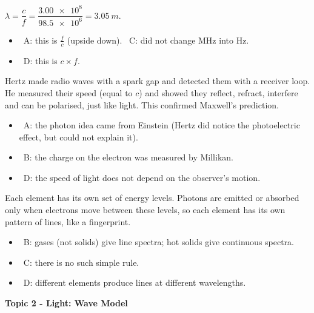 \documentclass[12pt]{article}
\newcommand\anstopic[1]{\par\Needspace{8\baselineskip}\vspace{4mm}%
  \begin{center}{\headfont\bfseries\fontsize{14}{18}\selectfont #1\par}\end{center}\vspace{2pt}}
\begin{document}
\begin{practiceanswers}
\begin{practiceans}
  $\lambda = \dfrac{c}{f} = \dfrac{\num{3.00e8}}{\num{98.5e6}} = \qty{3.05}{m}$.
  \begin{itemize}
    \item \xmark\ A: this is $\frac{f}{c}$ (upside down). \quad \xmark\ C: did not change MHz into Hz.
    \item \xmark\ D: this is $c \times f$.
  \end{itemize}
\end{practiceans}

\begin{practiceans}
  Hertz made radio waves with a spark gap and detected them with a receiver loop. He measured their
  speed (equal to $c$) and showed they reflect, refract, interfere and can be polarised, just like
  light. This confirmed Maxwell's prediction.
  \begin{itemize}
    \item \xmark\ A: the photon idea came from Einstein (Hertz did notice the photoelectric effect, but
          could not explain it).
    \item \xmark\ B: the charge on the electron was measured by Millikan.
    \item \xmark\ D: the speed of light does not depend on the observer's motion.
  \end{itemize}
\end{practiceans}

\begin{practiceans}
  Each element has its own set of energy levels. Photons are emitted or absorbed only when electrons
  move between these levels, so each element has its own pattern of lines, like a fingerprint.
  \begin{itemize}
    \item \xmark\ B: gases (not solids) give line spectra; hot solids give continuous spectra.
    \item \xmark\ C: there is no such simple rule.
    \item \xmark\ D: different elements produce lines at different wavelengths.
  \end{itemize}
\end{practiceans}

\anstopic{Topic 2 - Light: Wave Model}


\end{practiceanswers}
\end{document}
